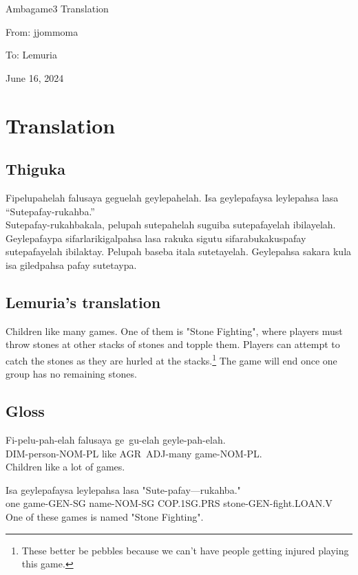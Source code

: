 \documentclass{thiguka}
\begin{document}
Ambagame3 Translation

From: jjommoma

To: Lemuria

June 16, 2024

\section{Translation}
\subsection{Thiguka}
Fipelupahelah falusaya geguelah geylepahelah.
Isa geylepafaysa leylepahsa lasa “Sutepafay-rukahba.”\\
Sutepafay-rukahbakala, pelupah sutepahelah suguiba sutepafayelah ibilayelah.
Geylepafaypa sifarlarikigalpahsa lasa rakuka sigutu sifarabukakuspafay sutepafayelah ibilaktay.
Pelupah baseba itala sutetayelah.
Geylepahsa sakara kula isa giledpahsa pafay sutetaypa.

\subsection{Lemuria's translation}
Children like many games.
One of them is "Stone Fighting", where players must throw stones at other stacks of stones and topple them.
Players can attempt to catch the stones as they are hurled at the stacks.\footnote[1]{These better be pebbles because we can't have people getting injured playing this game.}
The game will end once one group has no remaining stones.

\subsection{Gloss}

\begin{exe}
\ex{} \gll{}Fi-pelu-pah-elah falusaya ge~gu-elah geyle-pah-elah.\\
            DIM-person-NOM-PL like AGR~ADJ-many game-NOM-PL.\\
      \glt{}Children like a lot of games.
\end{exe}

\begin{exe}
\ex{} \gll{}Isa geylepafaysa leylepahsa lasa "Sute-pafay---rukahba."\\
            one game-GEN-SG name-NOM-SG COP.1SG.PRS stone-GEN-fight.LOAN.V\\
      \glt{}One of these games is named "Stone Fighting".
\end{exe}
\end{document}
